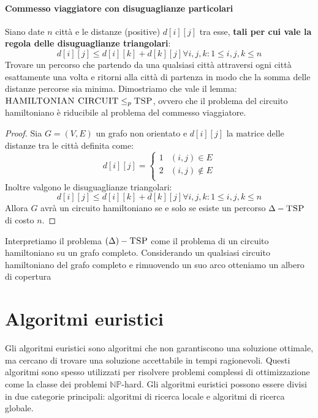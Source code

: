     \paragraph{Commesso viaggiatore con disuguaglianze particolari} 
        Siano date $n$ città e le distanze (positive) $d[i][j]$ tra esse, \textbf{tali per cui vale la regola delle disuguaglianze triangolari}: 
        $$
            d[i][j] \leq d[i][k] + d[k][j] \forall i,j,k: 1\leq i,j,k\leq n
        $$
        Trovare un percorso che partendo da una qualsiasi città attraversi ogni città esattamente una volta e ritorni alla città di partenza in modo che la somma delle distanze percorse sia minima.\newline
        Dimostriamo che vale il lemma: $\textsc{HAMILTONIAN CIRCUIT} \leq_{p} \textsc{TSP}$, ovvero che il problema del circuito hamiltoniano è riducibile al problema del commesso viaggiatore. \newline
        \begin{proof}
            Sia $G=(V,E)$ un grafo non orientato e $d[i][j]$ la matrice delle distanze tra le città definita come:
            $$
                d[i][j] = \begin{cases}
                    1 & (i,j)\in E\\
                    2 & (i,j)\not\in E\\
                \end{cases}
            $$
            Inoltre valgono le disuguaglianze triangolari:
            $$
                d[i][j] \leq d[i][k] + d[k][j] \forall i,j,k: 1\leq i,j,k\leq n
            $$
            Allora $G$ avrà un circuito hamiltoniano se e solo se esiste un percorso $\Delta-\textsc{TSP}$ di costo $n$.
        \end{proof}
        Interpretiamo il problema $(\Delta)-\textsc{TSP}$ come il problema di un circuito hamiltoniano su un grafo completo.\newline 
        Considerando un qualsiasi circuito hamiltoniano del grafo completo e rimuovendo un suo arco otteniamo un albero di copertura
\section{Algoritmi euristici}
    Gli algoritmi euristici sono algoritmi che non garantiscono una soluzione ottimale, ma cercano di trovare una soluzione accettabile in tempi ragionevoli. Questi algoritmi sono spesso utilizzati per risolvere problemi complessi di ottimizzazione come la classe dei problemi $\mathbb{NP}$-hard. Gli algoritmi euristici possono essere divisi in due categorie principali: algoritmi di ricerca locale e algoritmi di ricerca globale.
